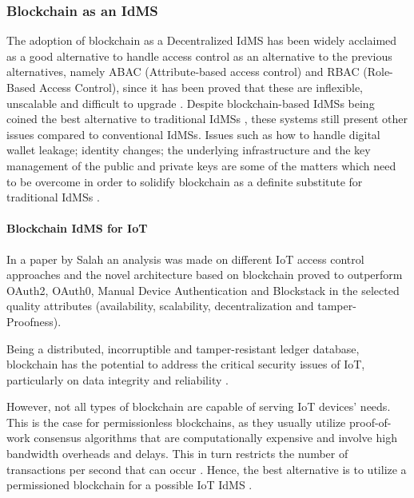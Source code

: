 \subsubsection{Blockchain as an IdMS}
\label{subsubsec:blockchain_as_an_IdMs}

The adoption of blockchain as a Decentralized IdMS has been widely acclaimed as a good alternative to handle access control as an alternative to the previous alternatives, namely ABAC (Attribute-based access control) and
RBAC (Role-Based Access Control), since it has been proved that these are inflexible, unscalable and difficult to upgrade \cite{liu2012authentication}. Despite blockchain-based IdMSs being coined the best alternative to traditional IdMSs \cite{10.1145/3352411.3352435}, these systems still present other issues compared to conventional IdMSs. Issues such as how to handle digital wallet leakage; identity changes; the underlying infrastructure and the key management of the public and private keys are some of the matters which need to be overcome in order to solidify blockchain as a definite substitute for traditional IdMSs \cite{liu2020blockchain}. 

\paragraph{Blockchain IdMS for IoT}

In a paper by Salah \cite{inproceedingsSalah} an analysis was made on different IoT access control approaches and the novel architecture based on blockchain proved to outperform OAuth2, OAuth0, Manual Device Authentication and Blockstack in the selected quality attributes (availability, scalability, decentralization and tamper-Proofness).

Being a distributed, incorruptible and tamper-resistant ledger database, blockchain has the potential to address the critical security issues of IoT, particularly on data integrity and reliability \cite{inbookWang}. 

However, not all types of blockchain are capable of serving IoT devices' needs. This is the case for permissionless blockchains, as they usually utilize proof-of-work consensus algorithms that are computationally expensive and involve high bandwidth overheads and delays. This in turn restricts the number of transactions per second that can occur \cite{luecking2020decentralized} \cite{lupascu2020dlt}. Hence, the best alternative is to utilize a permissioned blockchain for a possible IoT IdMS \cite{lo2019analysis}. 

